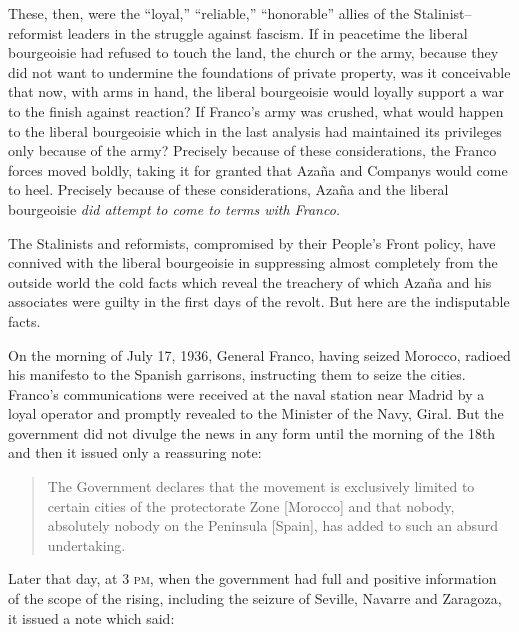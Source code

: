 These, then, were the ``loyal,'' ``reliable,'' ``honorable'' allies of the Stalinist--reformist leaders in the struggle against fascism. If in peacetime the liberal bourgeoisie had refused to touch the land, the church or the army, because they did not want to undermine the foundations of private property, was it conceivable that now, with arms in hand, the liberal bourgeoisie would loyally support a war to the finish against reaction? If Franco’s army was crushed, what would happen to the liberal bourgeoisie which in the last analysis had maintained its privileges only because of the army? Precisely because of these considerations, the Franco forces moved boldly, taking it for granted that Azaña and Companys would come to heel. Precisely because of these considerations, Azaña and the liberal bourgeoisie \emph{did attempt to come to terms with Franco.}

The Stalinists and reformists, compromised by their People’s Front policy, have connived with the liberal bourgeoisie in suppressing almost completely from the outside world the cold facts which reveal the treachery of which Azaña and his associates were guilty in the first days of the revolt. But here are the indisputable facts.

\indexFFranco{}
On the morning of July 17, 1936, General Franco, having seized Morocco, radioed his manifesto to the Spanish garrisons, instructing them to seize the cities. Franco’s communications were received at the naval station near Madrid by a loyal operator and promptly revealed to the Minister of the Navy, Giral. But the government did not divulge the news in any form until the morning of the 18th and then it issued only a reassuring note:

\begin{quotation}
  The Government declares that the movement is exclusively limited to certain cities of the protectorate Zone [Morocco] and that nobody, absolutely nobody on the Peninsula [Spain], has added to such an absurd undertaking.
\end{quotation}

Later that day, at 3 \textsc{pm,} when the government had full and positive information of the scope of the rising, including the seizure of Seville, Navarre and Zaragoza, it issued a note which said:

